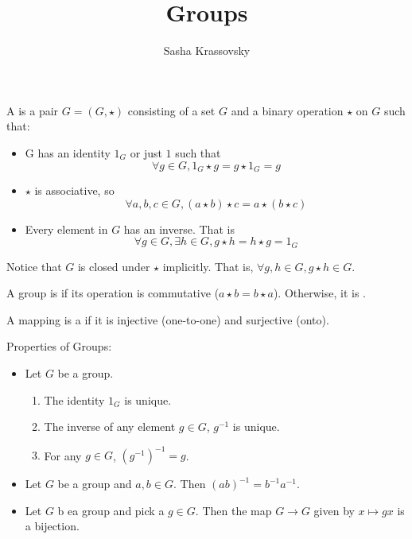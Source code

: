 \documentclass{article}
\title{Groups}
\author{Sasha Krassovsky}
\begin{document}
\maketitle

\begin{defn}
  A  is a pair $G = (G, \star)$ consisting of a set $G$
  and a binary operation $\star$ on $G$ such that:
  \begin{itemize}
  \item G has an identity $1_G$ or just $1$ such that
    $$\forall g \in G, 1_G \star g = g \star 1_G = g$$
  \item $\star$ is associative, so
    $$\forall a, b, c \in G, (a \star b) \star c = a \star (b \star c)$$
  \item Every element in $G$ has an inverse. That is
    $$\forall g \in G, \exists h \in G, g \star h = h \star g = 1_G$$    
  \end{itemize}
\end{defn}

\begin{remark}
  Notice that $G$ is closed under $\star$ implicitly. That is,
  $\forall g, h \in G, g \star h \in G$. 
\end{remark}

\begin{defn}
  A group is  if its operation is commutative ($a \star b = b \star a$).
  Otherwise, it is . 
\end{defn}

\begin{defn}
  A mapping is a  if it is injective (one-to-one) and
  surjective (onto). 
\end{defn}

\noindent Properties of Groups:
\begin{itemize}
\item Let $G$ be a group.
  \begin{enumerate}
  \item The identity $1_G$ is unique.
  \item The inverse of any element $g \in G$, $g^{-1}$ is unique.
  \item For any $g \in G$, $(g^{-1})^{-1} = g$.
  \end{enumerate}
\item Let $G$ be a group and $a, b \in G$. Then $(ab)^{-1} = b^{-1}a^{-1}$.
\item Let $G$ b ea group and pick a $g \in G$. Then the map $G \rightarrow G$ given
  by $x \mapsto gx$ is a bijection. 
\end{itemize}
\end{document}
